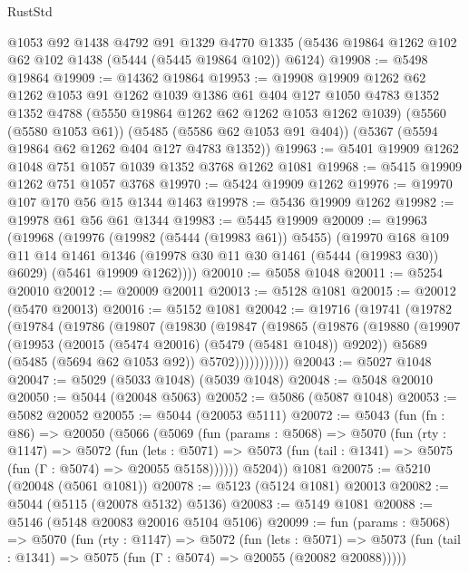 \begin{lexlean}{RustStd}
\begin{coremodule}
    @1053
    @92
    @1438
    @4792
    @91
    @1329
    @4770
    @1335
    (@5436 @19864 @1262 @102 @62 @102 @1438 (@5444 (@5445 @19864 @102)) @6124)
@19908 := @5498 @19864
@19909 := @14362 @19864
@19953 := @19908
    @19909
    @1262
    @62
    @1262
    @1053
    @91
    @1262
    @1039
    @1386
    @61
    @404
    @127
    @1050
    @4783
    @1352
    @1352
    @4788
    (@5550 @19864 @1262 @62 @1262 @1053 @1262 @1039)
    (@5560 (@5580 @1053 @61))
    (@5485 (@5586 @62 @1053 @91 @404))
    (@5367 (@5594 @19864 @62 @1262 @404 @127 @4783 @1352))
@19963 := @5401 @19909 @1262 @1048 @751 @1057 @1039 @1352 @3768 @1262 @1081
@19968 := @5415 @19909 @1262 @751 @1057 @3768
@19970 := @5424 @19909 @1262
@19976 := @19970 @107 @170 @56 @15 @1344 @1463
@19978 := @5436 @19909 @1262
@19982 := @19978 @61 @56 @61 @1344
@19983 := @5445 @19909
@20009 := @19963
    (@19968
      (@19976
        (@19982 (@5444 (@19983 @61)) @5455)
        (@19970
          @168
          @109
          @11
          @14
          @1461
          @1346
          (@19978 @30 @11 @30 @1461 (@5444 (@19983 @30)) @6029)
          (@5461 @19909 @1262))))
@20010 := @5058 @1048
@20011 := @5254 @20010
@20012 := @20009 @20011
@20013 := @5128 @1081
@20015 := @20012 (@5470 @20013)
@20016 := @5152 @1081
@20042 := @19716
    (@19741
      (@19782
        (@19784
          (@19786
            (@19807
              (@19830
                (@19847
                  (@19865
                    (@19876
                      (@19880
                        (@19907
                          (@19953 (@20015 (@5474 @20016) (@5479 (@5481 @1048)) @9202))
                          @5689
                          (@5485 (@5694 @62 @1053 @92))
                          @5702)))))))))))
@20043 := @5027 @1048
@20047 := @5029 (@5033 @1048) (@5039 @1048)
@20048 := @5048 @20010
@20050 := @5044 (@20048 @5063)
@20052 := @5086 (@5087 @1048)
@20053 := @5082 @20052
@20055 := @5044 (@20053 @5111)
@20072 := @5043
    (fun (fn : @86) =>
    @20050
      (@5066
        (@5069
          (fun (params : @5068) =>
          @5070
            (fun (rty : @1147) =>
            @5072
              (fun (lets : @5071) =>
              @5073 (fun (tail : @1341) => @5075 (fun (Γ : @5074) => @20055 @5158))))))
        @5204))
    @1081
@20075 := @5210 (@20048 (@5061 @1081))
@20078 := @5123 (@5124 @1081) @20013
@20082 := @5044 (@5115 (@20078 @5132) @5136)
@20083 := @5149 @1081
@20088 := @5146 (@5148 @20083 @20016 @5104 @5106)
@20099 := fun (params : @5068) =>
  @5070
    (fun (rty : @1147) =>
    @5072
      (fun (lets : @5071) =>
      @5073 (fun (tail : @1341) => @5075 (fun (Γ : @5074) => @20055 (@20082 @20088)))))

\end{coremodule}
\end{lexlean}
